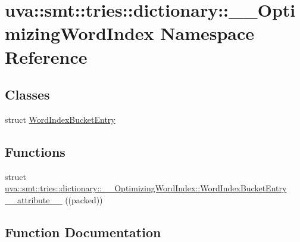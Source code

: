 \hypertarget{namespaceuva_1_1smt_1_1tries_1_1dictionary_1_1_____optimizing_word_index}{}\section{uva\+:\+:smt\+:\+:tries\+:\+:dictionary\+:\+:\+\_\+\+\_\+\+Optimizing\+Word\+Index Namespace Reference}
\label{namespaceuva_1_1smt_1_1tries_1_1dictionary_1_1_____optimizing_word_index}
\subsection*{Classes}
\begin{DoxyCompactItemize}
\item 
struct \hyperlink{structuva_1_1smt_1_1tries_1_1dictionary_1_1_____optimizing_word_index_1_1_word_index_bucket_entry}{Word\+Index\+Bucket\+Entry}
\end{DoxyCompactItemize}
\subsection*{Functions}
\begin{DoxyCompactItemize}
\item 
struct \hyperlink{structuva_1_1smt_1_1tries_1_1dictionary_1_1_____optimizing_word_index_1_1_word_index_bucket_entry}{uva\+::smt\+::tries\+::dictionary\+::\+\_\+\+\_\+\+Optimizing\+Word\+Index\+::\+Word\+Index\+Bucket\+Entry} \hyperlink{namespaceuva_1_1smt_1_1tries_1_1dictionary_1_1_____optimizing_word_index_ae06d59393cc9a96d9b30bc89879a400f}{\+\_\+\+\_\+attribute\+\_\+\+\_\+} ((packed))
\end{DoxyCompactItemize}


\subsection{Function Documentation}
\hypertarget{namespaceuva_1_1smt_1_1tries_1_1dictionary_1_1_____optimizing_word_index_ae06d59393cc9a96d9b30bc89879a400f}{}
